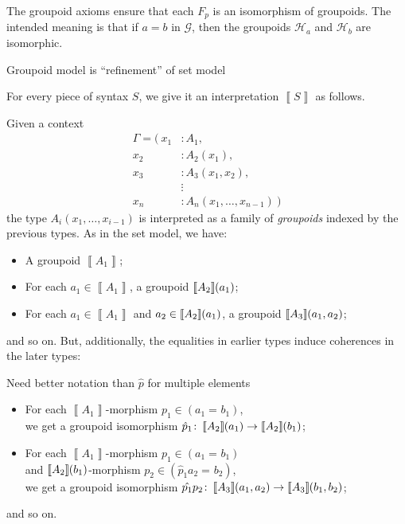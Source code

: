 \documentclass{article}
\theoremstyle{definition}
\renewcommand{\int}[1]
    {\left\llbracket #1 \right\rrbracket}       %
\newcommand{\G}{\mathcal{G}}
\newcommand{\Hh}{\mathcal{H}}
\renewcommand{\hom}[3][]{(#2 =_{#1} #3)}
\newcommand{\gfunc}[1]{\hat{#1}}
\newcommand{\n}{\hspace{-0.2em}}                %
\begin{document}
The groupoid axioms ensure that each $F_p$ is an isomorphism of groupoids. The intended meaning is that if $a=b$ in $\G$, then the groupoids $\Hh_a$ and $\Hh_b$ are isomorphic.

{\color{red} Groupoid model is ``refinement'' of set model}




For every piece of syntax $S$, we give it an interpretation $\int{S}$ as follows.

Given a context\vspace{-6mm}
\begin{align*}
    \Gamma = \big(\
    x_1 &: A_1,\\
    x_2 &: A_2(x_1),\\
    x_3 &: A_3(x_1,x_2),\\
    &\mathrel{\vdots}\\
    x_n &: A_n(x_1,\ldots,x_{n-1})\ \big)
\end{align*}
the type $A_i(x_1,\ldots,x_{i-1})$ is interpreted as a family of \textit{groupoids} indexed by the previous types. As in the set model, we have:
\begin{itemize}
    \item A groupoid $\int{A_1}$;
    
    \item For each $a_1 \in \int{A_1}$, a groupoid $\int{A_2}\n(a_1)$;
    
    \item For each $a_1 \in \int{A_1}$ and $a_2 \in \int{A_2}\n(a_1)$, a groupoid $\int{A_3}\n(a_1,a_2)$;
\end{itemize}
and so on. But, additionally, the equalities in earlier types induce coherences in the later types:

{\color{red} Need better notation than $\gfunc{p}$ for multiple elements}
\begin{itemize}
    \item For each $\int{A_1}$-morphism $p_1 \in \hom{a_1}{b_1}$,\\ we get a groupoid isomorphism $\gfunc{p}_1\colon \int{A_2}\n(a_1) \to \int{A_2}\n(b_1)$;
    
    \item For each $\int{A_1}$-morphism $p_1 \in \hom{a_1}{b_1}$\\ and $\int{A_2}\n(b_1)$-morphism $p_2 \in \hom{\gfunc{p}_1 a_2}{b_2}$,\\ we get a groupoid isomorphism $\gfunc{p_1}{p_2}\colon \int{A_3}\n(a_1,a_2) \to \int{A_3}\n(b_1,b_2)$;
\end{itemize}
and so on.
\end{document}

